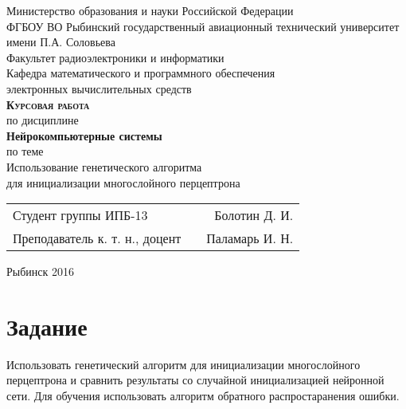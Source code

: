 \documentclass[a4paper,12pt]{article}
\begin{document}
\begin{titlepage}
\newpage


\begin{center}
	\large		
   	Министерство образования и науки Российской Федерации\\[0.5cm]
    	
	ФГБОУ ВО Рыбинский государственный авиационный технический университет имени П.А. Соловьева\\[1.0cm]

	Факультет радиоэлектроники и информатики\\[0.25cm]
		
	Кафедра математического и программного обеспечения\\ электронных вычислительных средств\\[1.5cm]
	
	\Large
	\textbf{\textsc{Курсовая работа}}\\[0.25cm]
	по  дисциплине\\
	\textbf{Нейрокомпьютерные системы}\\[0.5cm]
	
	по теме\\
	Использование генетического алгоритма \\для инициализации многослойного перцептрона
	
\end{center}

\vfill	
\begin{tabularx}{0.95\textwidth}{lXr}
Студент группы ИПБ-13 					& &	Болотин Д. И.\\

Преподаватель к. т. н., доцент			& & Паламарь И. Н.\\
\end{tabularx}

\vspace{1.5cm}
\center Рыбинск 2016
\end{titlepage}	


\newpage
\setcounter{page}{2}

\tableofcontents

\newpage\section*{Задание}
Использовать генетический алгоритм для инициализации многослойного перцептрона и сравнить результаты со случайной инициализацией нейронной сети. Для обучения использовать алгоритм обратного распростаранения ошибки.
\end{document}
